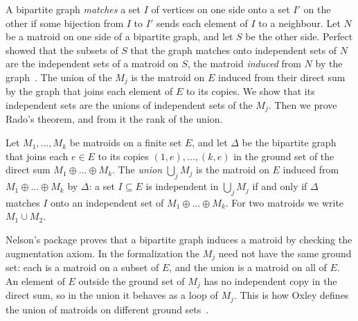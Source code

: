A bipartite graph \emph{matches} a set $I$ of vertices on one side onto
a set $I'$ on the other if some bijection from $I$ to $I'$ sends each
element of $I$ to a neighbour. Let $N$ be a matroid on one side of a
bipartite graph, and let $S$ be the other side. Perfect showed that the
subsets of $S$ that the graph matches onto independent sets of $N$ are
the independent sets of a matroid on $S$, the matroid \emph{induced}
from $N$ by the graph~\cite[Theorem~11.2.12]{oxley2011}. The union of
the $M_j$ is the matroid on $E$ induced from their direct sum by the
graph that joins each element of $E$ to its copies. We show that its
independent sets are the unions of independent sets of the $M_j$. Then
we prove Rado's theorem, and from it the rank of the union.

\begin{definition}
  \label{def:matroid-union}
  \leanok
  Let $M_1, \dots, M_k$ be matroids on a finite set $E$, and let
  $\Delta$ be the bipartite graph that joins each $e \in E$ to its
  copies $(1, e), \dots, (k, e)$ in the ground set of the direct sum
  $M_1 \oplus \dots \oplus M_k$. The \emph{union} $\bigcup_j M_j$ is
  the matroid on $E$ induced from $M_1 \oplus \dots \oplus M_k$ by
  $\Delta$: a set $I \subseteq E$ is independent in $\bigcup_j M_j$ if
  and only if $\Delta$ matches $I$ onto an independent set of
  $M_1 \oplus \dots \oplus M_k$. For two matroids we write
  $M_1 \cup M_2$.
\end{definition}
\begin{fmlnote}
  Nelson's package proves that a bipartite graph induces a matroid by
  checking the augmentation axiom. In the formalization the $M_j$ need
  not have the same ground set: each is a matroid on a subset of $E$,
  and the union is a matroid on all of $E$. An element of $E$ outside
  the ground set of $M_j$ has no independent copy in the direct sum, so
  in the union it behaves as a loop of $M_j$. This is how Oxley defines
  the union of matroids on different ground
  sets~\cite[\S11.3]{oxley2011}.
\end{fmlnote}

